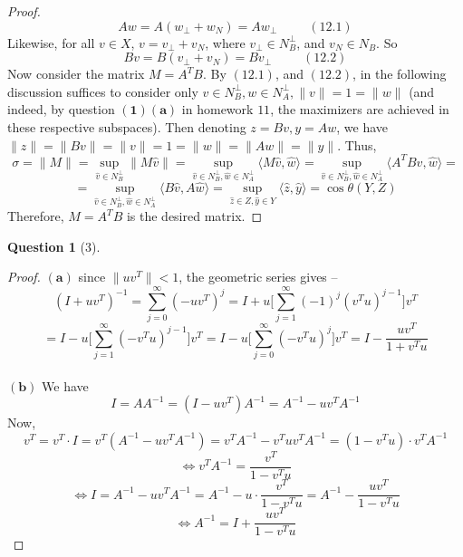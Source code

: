 \documentclass[11pt]{article}
\theoremstyle{quest}
\newtheorem*{question}{Question}
\begin{document}
\begin{proof}
$$Aw = A(w_{\perp} + w_N) = Aw_{\perp}\ \ \ \ \ \ \ \ \ \ \ (12.1)$$
Likewise, for all $v \in X$, $v = v_{\perp} + v_N$, where $v_{\perp} \in N_B^{\perp}$, and $v_N \in N_B$. So
$$Bv = B(v_{\perp} + v_N) = Bv_{\perp}\ \ \ \ \ \ \ \ \ \ \ (12.2)$$
Now consider the matrix $M = A^TB$. By $(12.1)$, and $(12.2)$, in the following discussion suffices to consider only $v \in N_B^{\perp}, w \in N_A^{\perp}, \|v\| = 1 = \|w\|$ (and indeed, by question $\mathbf{(1)(a)}$ in homework $11$, the maximizers are achieved in these respective subspaces). Then denoting $z= Bv, y = Aw$, we have $\|z\| = \|Bv\| = \|v\| = 1 = \|w\| = \|Aw\| = \|y\|$. Thus,
$$\sigma = \|M\| = \sup_{\hat{v} \in N_B^{\perp}} \|M\hat{v}\| = \sup_{\hat{v} \in N_B^{\perp},\hat{w} \in N_A^{\perp}} \langle M\hat{v}, \hat{w} \rangle = \sup_{\hat{v} \in N_B^{\perp},\hat{w} \in N_A^{\perp}} \langle A^TB \hat{v}, \hat{w} \rangle = $$ $$= \sup_{\hat{v} \in N_B^{\perp},\hat{w} \in N_A^{\perp}} \langle B \hat{v}, A \hat{w} \rangle = \sup_{\hat{z} \in Z, \hat{y} \in Y} \langle \hat{z}, \hat{y} \rangle = \cos \theta(Y, Z)$$
Therefore, $M = A^TB$ is the desired matrix.
\end{proof}

\begin{question}[3]
\end{question}
\begin{proof}
$\mathbf{(a)}$ since $\|uv^T\| < 1$, the geometric series gives --
$$(I + uv^T)^{-1} = \sum_{j=0}^\infty (-uv^T)^j = I + u \Big[\sum_{j=1}^\infty (-1)^j(v^Tu)^{j-1}\Big] v^T$$
$$= I - u \Big[\sum_{j=1}^\infty (-v^Tu)^{j-1}\Big] v^T = I - u \Big[\sum_{j=0}^\infty (-v^Tu)^j\Big] v^T = I - \dfrac{uv^T}{1 + v^Tu}$$
\\$\mathbf{(b)}$ We have
$$I = AA^{-1} = (I - uv^T)A^{-1} = A^{-1} - uv^TA^{-1}$$
Now,
$$v^T = v^T \cdot I = v^T(A^{-1} - uv^TA^{-1}) = v^T A^{-1} - v^Tuv^TA^{-1} = (1 - v^Tu) \cdot v^TA^{-1}$$
$$\iff v^TA^{-1} = \dfrac{v^T}{1 - v^Tu}$$
$$\iff I = A^{-1} - uv^TA^{-1} = A^{-1} - u \cdot \dfrac{v^T}{1 - v^Tu} = A^{-1} - \dfrac{uv^T}{1 - v^Tu}$$
$$\iff A^{-1} = I + \dfrac{uv^T}{1 - v^Tu}$$
\end{proof}
\end{document}

